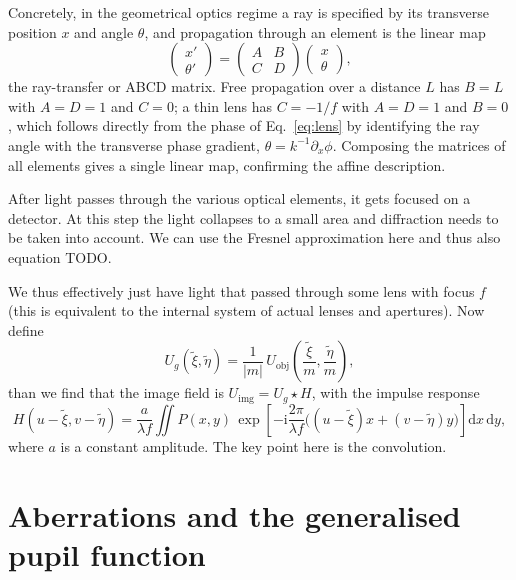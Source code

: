 \documentclass[11pt]{book}
\begin{document}
Concretely, in the geometrical optics regime a ray is specified by its transverse position $x$ and angle $\theta$, and propagation through an element is the linear map
\begin{equation}
\begin{pmatrix} x' \\ \theta' \end{pmatrix}
= \begin{pmatrix} A & B \\ C & D \end{pmatrix}
\begin{pmatrix} x \\ \theta \end{pmatrix},
\label{eq:abcd}
\end{equation}
the ray-transfer or ABCD matrix. Free propagation over a distance $L$ has $B=L$ with $A=D=1$ and $C=0$; a thin lens has $C=-1/f$ with $A=D=1$ and $B=0$, which follows directly from the phase of Eq.~\eqref{eq:lens} by identifying the ray angle with the transverse phase gradient, $\theta = k^{-1}\partial_x\phi$. Composing the matrices of all elements gives a single linear map, confirming the affine description.

After light passes through the various optical elements, it gets focused on a detector. At this step the light collapses to a small area and diffraction needs to be taken into account. We can use the Fresnel approximation here and thus also equation TODO. 

We thus effectively just have light that passed through some lens with focus $f$ (this is equivalent to the internal system of actual lenses and apertures). Now define
\begin{equation}
U_g(\tilde\xi,\tilde\eta) = \frac{1}{|m|}\,U_{\mathrm{obj}}\!\left(\frac{\tilde\xi}{m},\frac{\tilde\eta}{m}\right),
\label{eq:idealimage}
\end{equation}
than we find that 
the image field is $U_{\mathrm{img}} = U_g\star H$, with the impulse response
\begin{equation}
H(u-\tilde\xi,v-\tilde\eta) = \frac{a}{\lambda f}\iint P(x,y)\,
\exp\!\left[-\mathrm{i}\frac{2\pi}{\lambda f}\big((u-\tilde\xi)x+(v-\tilde\eta)y\big)\right]\mathrm{d}x\,\mathrm{d}y,
\label{eq:generalimpulse}
\end{equation}
where $a$ is a constant amplitude. The key point here is the convolution.

\section{Aberrations and the generalised pupil function}
\end{document}

